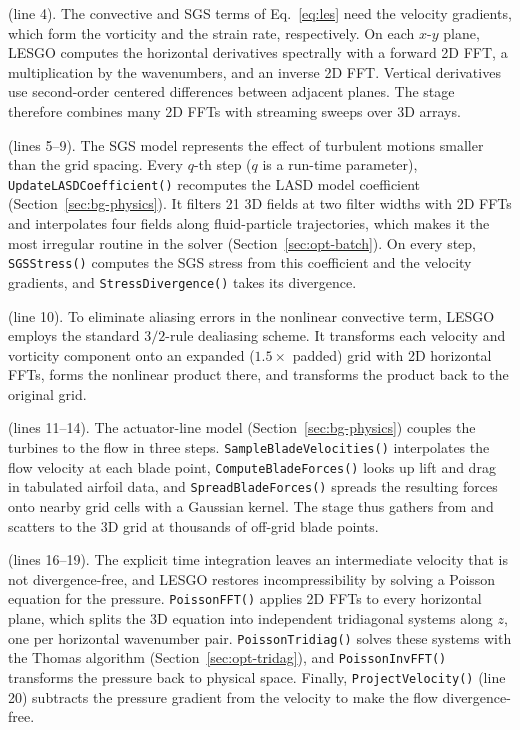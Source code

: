  (line 4). The convective and SGS terms
of Eq.~\ref{eq:les} need the velocity gradients, which form the
vorticity and the strain rate, respectively. On each $x$-$y$ plane, LESGO computes the
horizontal derivatives spectrally with a forward 2D FFT, a
multiplication by the wavenumbers, and an inverse 2D FFT. Vertical
derivatives use second-order centered differences between adjacent
planes. The stage therefore combines many 2D FFTs with streaming sweeps
over 3D arrays.

 (lines 5--9). The SGS model represents the effect
of turbulent motions smaller than the grid spacing. Every $q$-th step ($q$ is a run-time parameter),
\texttt{UpdateLASDCoefficient()} recomputes
the LASD model coefficient (Section~\ref{sec:bg-physics}). It filters
21 3D fields at two filter widths with 2D FFTs and interpolates four fields along
fluid-particle trajectories, which makes it the most irregular
routine in the solver (Section~\ref{sec:opt-batch}). On
every step, \texttt{SGSStress()} computes the SGS stress from this
coefficient and the velocity gradients, and \texttt{StressDivergence()}
takes its divergence.

 (line 10). To eliminate aliasing errors 
in the nonlinear convective term, LESGO employs 
the standard $3/2$-rule dealiasing scheme. It transforms each velocity
and vorticity component onto an expanded ($1.5\times$ padded) grid with
2D horizontal FFTs, forms the nonlinear product there, and transforms
the product back to the original grid. 

 (lines 11--14). The actuator-line model
(Section~\ref{sec:bg-physics}) couples the turbines to the flow in three
steps. \texttt{SampleBladeVelocities()} interpolates the flow velocity at
each blade point, \texttt{ComputeBladeForces()} looks up lift and drag
in tabulated airfoil data, and \texttt{SpreadBladeForces()} spreads the
resulting forces onto nearby grid cells with a Gaussian kernel. The
stage thus gathers from and scatters to the 3D grid at thousands of
off-grid blade points.

 (lines 16--19). The explicit time
integration leaves an intermediate velocity that is not divergence-free,
and LESGO restores incompressibility by solving a Poisson equation for
the pressure. \texttt{PoissonFFT()} applies 2D FFTs to every horizontal
plane, which splits the 3D equation into independent tridiagonal systems
along $z$, one per horizontal wavenumber pair. \texttt{PoissonTridiag()}
solves these systems with the Thomas algorithm
(Section~\ref{sec:opt-tridag}), and \texttt{PoissonInvFFT()} transforms
the pressure back to physical space. Finally,
\texttt{ProjectVelocity()} (line 20) subtracts the pressure gradient
from the velocity to make the flow divergence-free.

